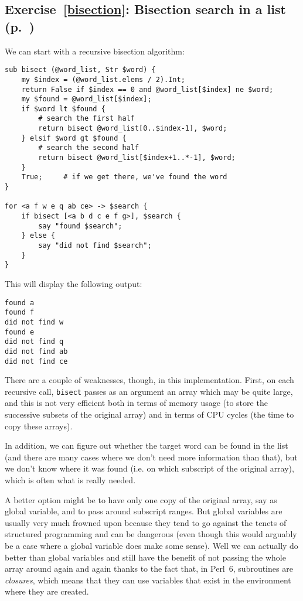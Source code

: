 {\subsection{Exercise~\ref{bisection}: Bisection search in a list (p.~\pageref{bisection})}
\label{sol_bisection}

We can start with a recursive bisection algorithm:


\begin{verbatim}
sub bisect (@word_list, Str $word) {
    my $index = (@word_list.elems / 2).Int;
    return False if $index == 0 and @word_list[$index] ne $word;
    my $found = @word_list[$index];
    if $word lt $found {
        # search the first half
        return bisect @word_list[0..$index-1], $word;
    } elsif $word gt $found {
        # search the second half
        return bisect @word_list[$index+1..*-1], $word;
    }
    True;     # if we get there, we've found the word
}

for <a f w e q ab ce> -> $search { 
    if bisect [<a b d c e f g>], $search {
        say "found $search";
    } else {
        say "did not find $search";
    }
}
\end{verbatim}

This will display the following output:
\begin{verbatim}
found a
found f
did not find w
found e
did not find q
did not find ab
did not find ce
\end{verbatim}

There are a couple of weaknesses, though, in this 
implementation. First, on each recursive call, 
{\tt bisect} passes as an argument an array 
which may be quite large, and this is not very 
efficient both in terms of memory usage (to store 
the successive subsets of the original array) and 
in terms of CPU cycles (the time to copy these 
arrays).

In addition, we can figure out whether the target word can 
be found in the list (and there are many cases where 
we don't need more information than that), but we don't 
know where it was found (i.e. on which subscript of 
the original array), which is often what is really 
needed.

A better option might be to have only one copy of the 
original array, say as global variable, and to pass 
around subscript ranges. But global variables are 
usually very much frowned upon because they tend to go 
against the tenets of structured programming and can 
be dangerous (even though this would arguably be a 
case where a global variable does make some sense). 
Well we can actually do better than global 
variables and still have the benefit of not passing 
the whole array around again and again thanks to the 
fact that, in Perl~6, subroutines are \emph{closures}, 
which means that they can use variables that exist in 
the environment where they are created.

}

